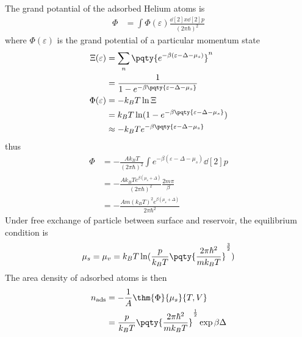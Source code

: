 \documentclass[12pt]{article}
\begin{document}
        \subsection{} The grand potantial of the adsorbed Helium atoms is
        \begin{align*}
            \Phi &= \int \Phi (\varepsilon) \frac{\dd[2]{x}\dd[2]{p}}{(2\pi\hbar)^2}
        \end{align*}
        where \(\Phi (\varepsilon)\) is the grand potential of a particular momentum state
        \begin{align*}
            \Xi (\varepsilon) &=\sum_n \pqty{e^{ - \beta (\varepsilon - \Delta -\mu_s )}}^n\\
            &= \frac{1}{1 - e^{ - \beta \pqty{\varepsilon -\Delta- \mu_s }}}\\
            \Phi(\varepsilon) &= - k_BT \ln \Xi\\
            &= k_BT\ln(1 - e^{ - \beta \pqty{\varepsilon -\Delta- \mu_s }})\\
            & \approx - k_BT e^{ - \beta \pqty{\varepsilon -\Delta- \mu_s}}
        \end{align*}
        thus \begin{align*}
            \Phi &= - \frac{A k_BT}{(2\pi\hbar)^2}  \int e^{ - \beta (\varepsilon - \Delta - \mu_s )}  \dd[2]{p}\\
            &= - \frac{A k_BT e^{ \beta (\mu_s + \Delta ) }}{(2\pi\hbar)^2}  \frac{2m\pi}{\beta }\\
            &= - \frac{A m(k_BT)^2 e^{ \beta (\mu_s + \Delta ) }}{2\pi\hbar^2}
        \end{align*}
        Under free exchange of particle between surface and reservoir, the equilibrium condition is \[
            \mu_s = \mu_v = k_BT \ln(\frac{p}{k_BT}\pqty{\frac{2\pi\hbar^2}{mk_BT}}^\frac{3}{2})
        \]
        The area density of adsorbed atoms is then 
        \begin{align*}
            n_\text{ads} &= - \frac{1}{A}\thm{\Phi}{\mu_s}{T,V}\\
            &= \frac{p}{k_BT}\pqty{\frac{2\pi\hbar^2}{mk_BT}}^\frac{1}{2} \exp{ \beta \Delta  }
        \end{align*}
    \newpage
    \section{}
\end{document}
